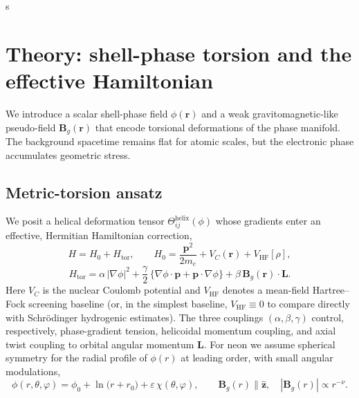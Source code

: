 s\documentclass[12pt]{article}
\begin{document}
\section{Theory: shell-phase torsion and the effective Hamiltonian}
We introduce a scalar shell-phase field $\phi(\bm{r})$ and a weak gravitomagnetic-like pseudo-field $\bm{B}_g(\bm{r})$ that encode torsional deformations of the phase manifold. The background spacetime remains flat for atomic scales, but the electronic phase accumulates geometric stress.

\subsection{Metric-torsion ansatz}
We posit a helical deformation tensor $\Theta_{ij}^{\mathrm{helix}}(\phi)$ whose gradients enter an effective, Hermitian Hamiltonian correction,
\begin{equation}
H = H_0 + H_{\mathrm{tor}}, \qquad
H_0 = \frac{\bm{p}^2}{2m_e} + V_C(\bm{r}) + V_{\mathrm{HF}}[\rho],
\end{equation}
\begin{equation}
H_{\mathrm{tor}} = \alpha\,|\nabla \phi|^2 + \frac{\gamma}{2}\,\big\{\nabla \phi \cdot \bm{p} + \bm{p}\cdot \nabla \phi \big\} + \beta\,\bm{B}_g(\bm{r})\cdot \bm{L}.
\label{eq:torHam}
\end{equation}
Here $V_C$ is the nuclear Coulomb potential and $V_{\mathrm{HF}}$ denotes a mean-field Hartree--Fock screening baseline (or, in the simplest baseline, $V_{\mathrm{HF}}\equiv 0$ to compare directly with Schrödinger hydrogenic estimates). The three couplings $(\alpha,\beta,\gamma)$ control, respectively, phase-gradient tension, helicoidal momentum coupling, and axial twist coupling to orbital angular momentum $\bm{L}$. For neon we assume spherical symmetry for the radial profile of $\phi(r)$ at leading order, with small angular modulations,
\begin{equation}
\phi(r,\theta,\varphi) = \phi_0 + \ln\!\big(r + r_0\big) + \varepsilon\,\chi(\theta,\varphi), \qquad \bm{B}_g(r)\parallel \hat{\bm{z}}, \quad |\bm{B}_g(r)| \propto r^{-\nu}.
\end{equation}
\end{document}
